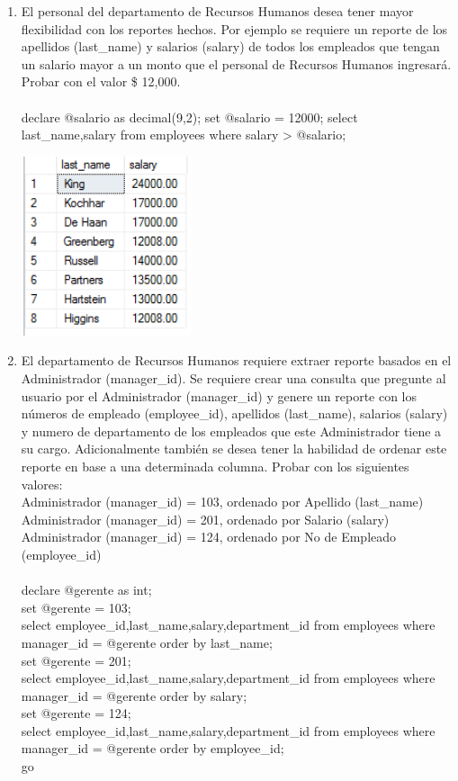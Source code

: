 \begin{enumerate}[1.]
	\item El personal del departamento de Recursos Humanos desea tener mayor flexibilidad con los reportes hechos. Por ejemplo se requiere un reporte de los apellidos (last\_name) y salarios (salary) de todos los empleados que tengan un salario mayor a un monto que el personal de Recursos Humanos ingresará. Probar con el valor \$ 12,000.
	\\ \\declare @salario as decimal(9,2); set @salario = 12000; select last\_name,salary from employees where salary > @salario;

	\begin{center}
	\includegraphics[width=5cm]{./Imagenes/actividad_04_10} 
	\end{center}

	\item El departamento de Recursos Humanos requiere extraer reporte basados en el Administrador (manager\_id). Se requiere crear una consulta que pregunte al usuario por el Administrador (manager\_id) y genere un reporte con los números de empleado (employee\_id), apellidos (last\_name), salarios (salary) y numero de departamento de los empleados que este Administrador tiene a su cargo. Adicionalmente también se desea tener la habilidad de ordenar este reporte en base a una determinada columna. Probar con los siguientes valores:
	\\Administrador (manager\_id) = 103, ordenado por Apellido (last\_name)
	\\Administrador (manager\_id) = 201, ordenado por Salario (salary)
	\\Administrador (manager\_id) = 124, ordenado por No de Empleado (employee\_id)
	\\ \\declare @gerente as int;
	\\set @gerente = 103;
	\\select employee\_id,last\_name,salary,department\_id from employees where manager\_id = @gerente order by last\_name;
	\\set @gerente = 201;
	\\select employee\_id,last\_name,salary,department\_id from employees where manager\_id = @gerente order by salary;
	\\set @gerente = 124;
	\\select employee\_id,last\_name,salary,department\_id from employees where manager\_id = @gerente order by employee\_id;
	\\go
	

\end{enumerate}
